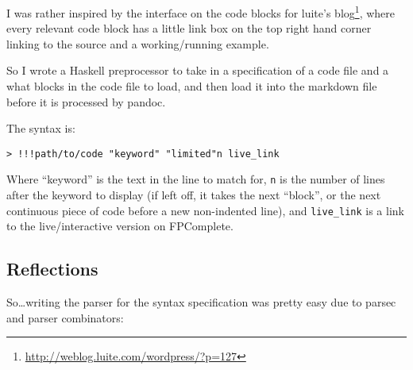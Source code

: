 \documentclass[]{article}
\renewcommand{\href}[2]{#2\footnote{\url{#1}}}
\begin{document}
I was rather inspired by the interface on the code blocks for
\href{http://weblog.luite.com/wordpress/?p=127}{luite's blog}, where every
relevant code block has a little link box on the top right hand corner linking
to the source and a working/running example.

So I wrote a Haskell preprocessor to take in a specification of a code file and
a what blocks in the code file to load, and then load it into the markdown file
before it is processed by pandoc.

The syntax is:

\begin{verbatim}
> !!!path/to/code "keyword" "limited"n live_link
\end{verbatim}

Where ``keyword'' is the text in the line to match for, \texttt{n} is the number
of lines after the keyword to display (if left off, it takes the next ``block'',
or the next continuous piece of code before a new non-indented line), and
\texttt{live\_link} is a link to the live/interactive version on FPComplete.

\hypertarget{reflections}{%
\subsection{Reflections}\label{reflections}}

So\ldots{}writing the parser for the syntax specification was pretty easy due to
parsec and parser combinators:
\end{document}

